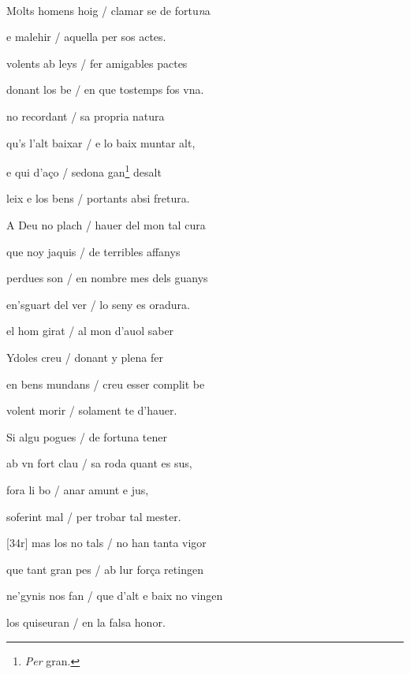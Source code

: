 \documentclass[12pt]{article}
\renewcommand{\espaiAbansEtiquetaPoema}{\vspace{0ex}}
\begin{document}
\begin{estrofa}

\espaiAbansEtiquetaPoema

\\

\end{estrofa}


\begin{estrofa}

 M\textsc{o}lts homens hoig / clamar se de fortu\textit{n}a

 e malehir / aquella per sos actes.

 volents ab leys / fer amigables pactes

 donant los be / en que tostemps fos vna.

 no recordant / sa propria natura

 qu's l'alt baixar / e lo baix muntar alt,

 e qui d'a\c{c}o / sedona gan\footnote{\textit{Per} gran.} desalt

 leix e los bens / portants absi fretura.

\end{estrofa}



\begin{estrofa}

 A Deu no plach / hauer del mon tal cura

 que noy jaquis / de terribles affanys

 perdues son / en nombre mes dels guanys

 en'sguart del ver / lo seny es oradura.

 el hom girat / al mon d'auol saber

 Ydoles creu / donant y plena fer

 en bens mundans / creu esser complit be

 volent morir / solament te d'hauer.

\end{estrofa}



\begin{estrofa}

 Si algu pogues / de fortuna tener

 ab vn fort clau / sa roda quant es sus,

 fora li bo / anar amunt e jus,

 soferint mal / per trobar tal mester.

 [34r] mas los no tals / no han tanta vigor

 que tant gran pes / ab lur for\c{c}a retingen

 ne'gynis nos fan / que d'alt e baix no vingen

 los quiseuran / en la falsa honor.

\end{estrofa}
\end{document}
